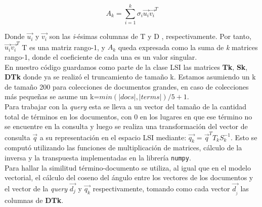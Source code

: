 \documentclass[spanish]{article}
\begin{document}
$$A_{k}=\sum^{k}_{i=1}\sigma_{i}\vec{u_{i}}\vec{v_{i}}^{T}$$

Donde $\vec{u_{i}}$ y $\vec{v_{i}}$ son las \textit{i}-ésimas columnas de T y D , respectivamente. Por tanto, $\vec{u_{i}}\vec{v_{i}}^{T}$ T es una matriz rango-1, y $A_{k}$ queda expresada como la suma de \textit{k} matrices rango-1, donde el coeficiente de cada una es un valor singular.\\

En nuestro código guardamos como parte de la clase LSI las matrices  \textbf{Tk}, \textbf{Sk}, \textbf{DTk} donde ya se realizó el truncamiento de tamaño k. Estamos asumiendo un k de tamaño 200 para colecciones de documentos grandes, en caso de colecciones más pequeñas se asume un k=$min(|docs|,|terms|)/5+1$. \\

Para trabajar con la \emph{query} esta se lleva a un vector del tamaño de la cantidad total de términos en los documentos, con 0 en los lugares en que ese término no se encuentre en la consulta y luego se realiza una transformación del vector de consulta $\vec{q}$ a su representación en el espacio LSI mediante: $\vec{q_{k}}=\vec{q}^{T}T_{k}S_{k}^{-1}$. Esto se computó utilizando las funciones de multiplicación de matrices, cálculo de la inversa y la transpuesta implementadas en la librería \texttt{numpy}. \\

Para hallar la similitud término-documento se utiliza, al igual que en el modelo vectorial, el cálculo del coseno del ángulo entre los vectores de los documentos y el vector de la \emph{query} $\vec{d_{j}}$ y $\vec{q_{k}}$ respectivamente, tomando como cada vector $\vec{d_{_{j}}}$ las columnas de \textbf{DTk}.
\end{document}
